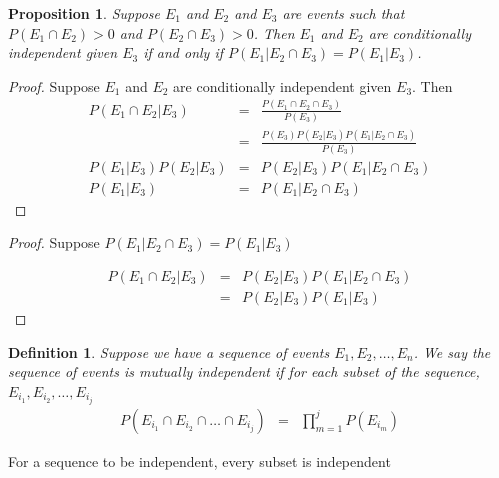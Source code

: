 \documentclass[handout]{beamer}
\newtheorem{prop}{Proposition}
\newtheorem{defn}{Definition}
\numberwithin{equation}{section}
\begin{document}
\begin{frame}

\begin{prop}
Suppose $E_{1}$ and $E_{2}$ and $E_{3}$ are events such that $P(E_{1} \cap E_{2})>0$ and $P(E_{2} \cap E_{3}) >0$.  Then $E_{1}$ and $E_{2}$ are conditionally independent given $E_{3} $ if and only if $P(E_{1} | E_{2} \cap E_{3})  = P(E_{1} | E_{3}) $.  
\end{prop}

\begin{proof}
Suppose $E_{1}$ and $E_{2}$ are conditionally independent given $E_{3}$.  Then 
\begin{eqnarray}
P(E_{1} \cap E_{2} |  E_{3}) & = & \frac{P(E_{1} \cap E_{2} \cap E_{3}  ) }{P(E_{3} )} \nonumber \\
& = & \frac{P(E_{3})P(E_{2} | E_{3} )P(E_{1} | E_{2} \cap E_{3} ) }{ P(E_{3} )}\nonumber \\
P(E_{1}|E_{3}) P(E_{2} | E_{3} ) & = & P(E_{2} | E_{3} )P(E_{1} | E_{2} \cap E_{3} )\nonumber \\
P(E_{1}|E_{3}) & = & P(E_{1} | E_{2} \cap E_{3} ) \nonumber 
\end{eqnarray}

\end{proof}





\end{frame}

\begin{frame}

\begin{proof}
Suppose $P(E_{1} | E_{2} \cap E_{3})  = P(E_{1} | E_{3}) $

\begin{eqnarray}
P(E_{1} \cap E_{2}| E_{3 } ) & = & P(E_{2} | E_{3} ) P(E_{1} | E_{2}\cap E_{3} ) \nonumber \\
 & = & P(E_{2} | E_{3} ) P(E_{1} | E_{3} ) \nonumber 
\end{eqnarray}

\end{proof}

\end{frame}








\begin{frame}

\begin{defn}
Suppose we have a sequence of events $E_{1}, E_{2}, \hdots, E_{n}$.  We say the sequence of events is \alert{mutually independent} if for each subset of the sequence,  $E_{i_{1}}, E_{i_{2}}, \hdots, E_{i_{j}}$ 
\begin{eqnarray}
P(E_{i_{1}}\cap E_{i_{2}}\cap \hdots \cap E_{i_{j}}) & = & \prod_{m = 1}^{j} P(E_{i_{m}}) \nonumber 
\end{eqnarray}
\end{defn}

\alert{For a sequence to be independent, every subset is independent }


\end{frame}
\end{document}
